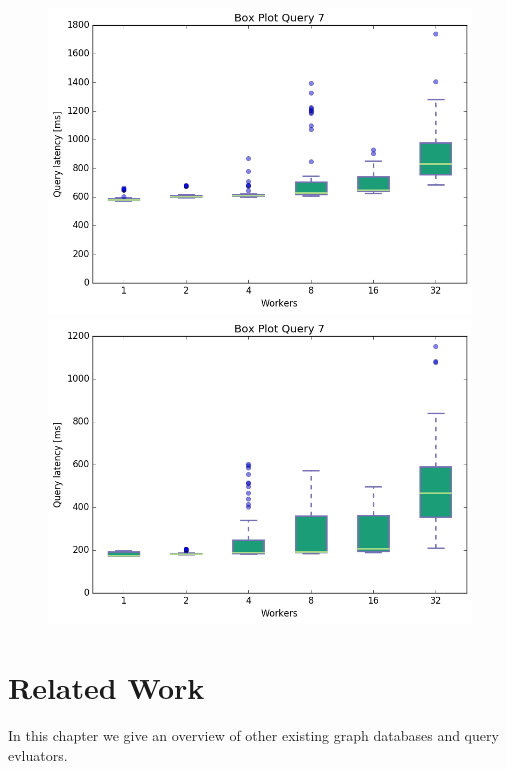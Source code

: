 \documentclass[11pt,singlecolumn]{scrartcl}
\begin{document}
\begin{figure}[!tbp]
  \centering
  \RawFloats
  \begin{minipage}[b]{0.5\textwidth}
    \includegraphics[width=\textwidth]{boxesjl/q7}
  \end{minipage}
  \hfill
  \begin{minipage}[b]{0.5\textwidth}
    \includegraphics[width=\textwidth]{boxesjs/q7}
  \end{minipage}
\end{figure}
\clearpage

\section{Related Work}
In this chapter we give an overview of other existing graph databases and query evluators.
\end{document}
